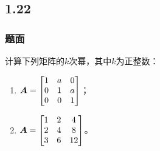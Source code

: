 \documentclass[9pt,xcolor=svgnames]{beamer} %
\begin{document}
\subsection*{1.22}
\begin{frame}
    \frametitle{题面}
    计算下列矩阵的\(k\)次幂，其中\(k\)为正整数：
    \begin{enumerate}
        \item \(\boldsymbol{A}=\begin{bmatrix}1&a&0\\0&1&a\\0&0&1\end{bmatrix}\)；
        \item \(\boldsymbol{A}=\begin{bmatrix}1&2&4\\2&4&8\\3&6&12\end{bmatrix}\)。
    \end{enumerate}
\end{frame}
\end{document}
